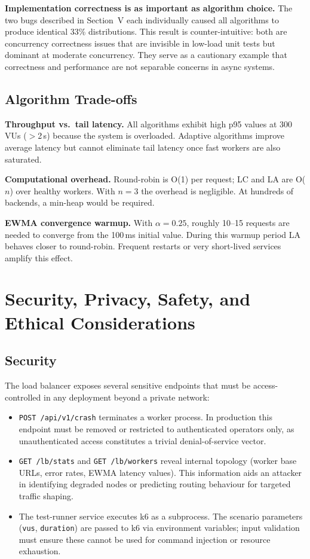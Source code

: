 \documentclass[conference]{IEEEtran}
\begin{document}
\textbf{Implementation correctness is as important as algorithm choice.}
The two bugs described in Section~V each individually caused all
algorithms to produce identical 33\% distributions. This result is
counter-intuitive: both are concurrency correctness issues that are
invisible in low-load unit tests but dominant at moderate concurrency.
They serve as a cautionary example that correctness and performance are
not separable concerns in async systems.

\subsection{Algorithm Trade-offs}

\textbf{Throughput vs.\ tail latency.} All algorithms exhibit high
p95 values at 300\,VUs ($>$2\,s) because the system is overloaded.
Adaptive algorithms improve average latency but cannot eliminate tail
latency once fast workers are also saturated.

\textbf{Computational overhead.} Round-robin is O(1) per request;
LC and LA are O($n$) over healthy workers. With $n=3$ the overhead
is negligible. At hundreds of backends, a min-heap would be required.

\textbf{EWMA convergence warmup.} With $\alpha=0.25$, roughly 10--15
requests are needed to converge from the 100\,ms initial value.
During this warmup period LA behaves closer to round-robin. Frequent
restarts or very short-lived services amplify this effect.

\section{Security, Privacy, Safety, and Ethical Considerations}

\subsection{Security}

The load balancer exposes several sensitive endpoints that must be
access-controlled in any deployment beyond a private network:
\begin{itemize}
    \item \texttt{POST /api/v1/crash} terminates a worker process. In
    production this endpoint must be removed or restricted to
    authenticated operators only, as unauthenticated access constitutes
    a trivial denial-of-service vector.
    \item \texttt{GET /lb/stats} and \texttt{GET /lb/workers} reveal
    internal topology (worker base URLs, error rates, EWMA latency
    values). This information aids an attacker in identifying degraded
    nodes or predicting routing behaviour for targeted traffic shaping.
    \item The test-runner service executes k6 as a subprocess. The
    scenario parameters (\texttt{vus}, \texttt{duration}) are passed
    to k6 via environment variables; input validation must ensure these
    cannot be used for command injection or resource exhaustion.
\end{itemize}
\end{document}
